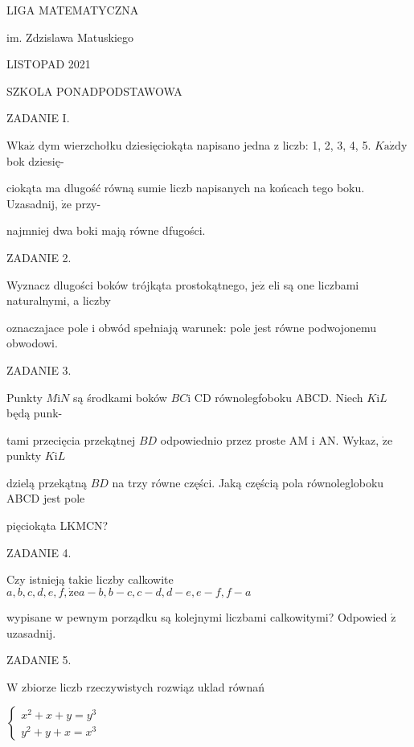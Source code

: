 \documentclass[a4paper,12pt]{article}
\begin{document}
LIGA MATEMATYCZNA

im. Zdzislawa Matuskiego

LISTOPAD 2021

SZKOLA PONADPODSTAWOWA

ZADANIE I.

$\mathrm{W}\mathrm{k}\mathrm{a}\dot{\mathrm{z}}$ dym wierzchołku dziesięciokąta napisano jedna z liczb: 1, 2, 3, 4, 5. $K\mathrm{a}\dot{\mathrm{z}}\mathrm{d}\mathrm{y}$ bok dziesię-

ciokąta ma dlugość równą sumie liczb napisanych na końcach tego boku. Uzasadnij, $\dot{\mathrm{z}}\mathrm{e}$ przy-

najmniej dwa boki mają równe dfugości.

ZADANIE 2.

Wyznacz dlugości boków trójkąta prostokątnego, $\mathrm{j}\mathrm{e}\dot{\mathrm{z}}$ eli są one liczbami naturalnymi, a liczby

oznaczajace pole i obwód spełniają warunek: pole jest równe podwojonemu obwodowi.

ZADANIE 3.

Punkty $M\mathrm{i}N$ są środkami boków $BC\mathrm{i}$ CD równolegfoboku ABCD. Niech $K\mathrm{i}L$ będą punk-

tami przecięcia przekątnej $BD$ odpowiednio przez proste AM $\mathrm{i}$ AN. Wykaz, $\dot{\mathrm{z}}\mathrm{e}$ punkty $K\mathrm{i}L$

dzielą przekątną $BD$ na trzy równe części. Jaką częścią pola równolegloboku ABCD jest pole

pięciokąta LKMCN?

ZADANIE 4.

Czy istnieją takie liczby calkowite $a, b, c, d, e, f, \dot{\mathrm{z}}\mathrm{e}a-b, b-c, c-d, d-e, e-f, f-a$

wypisane w pewnym porządku są kolejnymi liczbami calkowitymi? Odpowied $\acute{\mathrm{z}}$ uzasadnij.

ZADANIE 5.

$\mathrm{W}$ zbiorze liczb rzeczywistych rozwiąz uklad równań

$\left\{\begin{array}{l}
x^{2}+x+y=y^{3}\\
y^{2}+y+x=x^{3}
\end{array}\right.$
\end{document}
